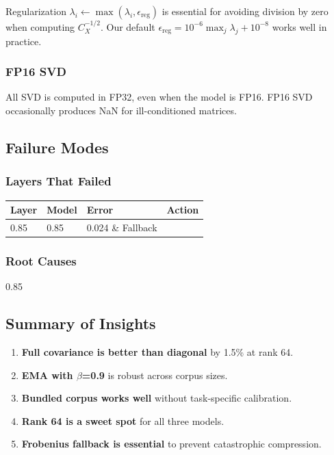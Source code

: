 Regularization $\lambda_i \leftarrow \max(\lambda_i, \epsilon_\text{reg})$ is 
essential for avoiding division by zero when computing $C_X^{-1/2}$. Our 
default $\epsilon_\text{reg} = 10^{-6} \max_j \lambda_j + 10^{-8}$ works 
well in practice.

\subsubsection{FP16 SVD}

All SVD is computed in FP32, even when the model is FP16. FP16 SVD 
occasionally produces NaN for ill-conditioned matrices.

\subsection{Failure Modes}

\subsubsection{Layers That Failed}

\begin{table}[H]
\centering
\small
\begin{tabular}{llll}
\toprule
\textbf{Layer} & \textbf{Model} & \textbf{Error} & \textbf{Action} \\
\midrule
0.85 & 0.85 & 0.024 \& Fallback \\
\bottomrule
\end{tabular}
\end{table}

\subsubsection{Root Causes}

0.85

\subsection{Summary of Insights}

\begin{enumerate}
\item \textbf{Full covariance is better than diagonal} by 1.5\% at rank 64.
\item \textbf{EMA with $\beta$=0.9} is robust across corpus sizes.
\item \textbf{Bundled corpus works well} without task-specific calibration.
\item \textbf{Rank 64 is a sweet spot} for all three models.
\item \textbf{Frobenius fallback is essential} to prevent catastrophic compression.
\end{enumerate}


